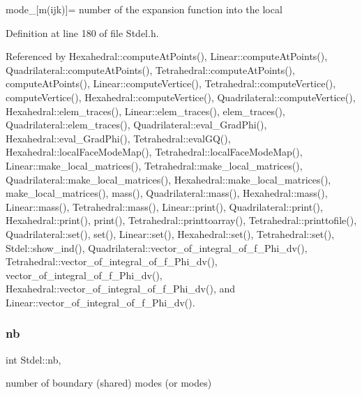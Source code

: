 mode\+\_\+\mbox{[}m(ijk)\mbox{]}= number of the expansion function into the local 



Definition at line 180 of file Stdel.\+h.



Referenced by Hexahedral\+::compute\+At\+Points(), Linear\+::compute\+At\+Points(), Quadrilateral\+::compute\+At\+Points(), Tetrahedral\+::compute\+At\+Points(), compute\+At\+Points(), Linear\+::compute\+Vertice(), Tetrahedral\+::compute\+Vertice(), compute\+Vertice(), Hexahedral\+::compute\+Vertice(), Quadrilateral\+::compute\+Vertice(), Hexahedral\+::elem\+\_\+traces(), Linear\+::elem\+\_\+traces(), elem\+\_\+traces(), Quadrilateral\+::elem\+\_\+traces(), Quadrilateral\+::eval\+\_\+\+Grad\+Phi(), Hexahedral\+::eval\+\_\+\+Grad\+Phi(), Tetrahedral\+::eval\+G\+Q(), Hexahedral\+::local\+Face\+Mode\+Map(), Tetrahedral\+::local\+Face\+Mode\+Map(), Linear\+::make\+\_\+local\+\_\+matrices(), Tetrahedral\+::make\+\_\+local\+\_\+matrices(), Quadrilateral\+::make\+\_\+local\+\_\+matrices(), Hexahedral\+::make\+\_\+local\+\_\+matrices(), make\+\_\+local\+\_\+matrices(), mass(), Quadrilateral\+::mass(), Hexahedral\+::mass(), Linear\+::mass(), Tetrahedral\+::mass(), Linear\+::print(), Quadrilateral\+::print(), Hexahedral\+::print(), print(), Tetrahedral\+::printtoarray(), Tetrahedral\+::printtofile(), Quadrilateral\+::set(), set(), Linear\+::set(), Hexahedral\+::set(), Tetrahedral\+::set(), Stdel\+::show\+\_\+ind(), Quadrilateral\+::vector\+\_\+of\+\_\+integral\+\_\+of\+\_\+f\+\_\+\+Phi\+\_\+dv(), Tetrahedral\+::vector\+\_\+of\+\_\+integral\+\_\+of\+\_\+f\+\_\+\+Phi\+\_\+dv(), vector\+\_\+of\+\_\+integral\+\_\+of\+\_\+f\+\_\+\+Phi\+\_\+dv(), Hexahedral\+::vector\+\_\+of\+\_\+integral\+\_\+of\+\_\+f\+\_\+\+Phi\+\_\+dv(), and Linear\+::vector\+\_\+of\+\_\+integral\+\_\+of\+\_\+f\+\_\+\+Phi\+\_\+dv().

\mbox{\label{classStdel_ad1d9acc38335d3fd779ba5c14f1507f8}} 
\subsubsection{\texorpdfstring{nb}{nb}}
{\footnotesize\ttfamily int Stdel\+::nb\hspace{0.3cm}{\ttfamily [protected]}, {\ttfamily [inherited]}}



number of boundary (shared) modes (or modes) 



